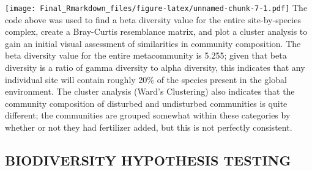 \documentclass[
]{article}
\begin{document}
\texttt{[image: Final\_Rmarkdown\_files/figure-latex/unnamed-chunk-7-1.pdf]}
The code above was used to find a beta diversity value for the entire
site-by-species complex, create a Bray-Curtis resemblance matrix, and
plot a cluster analysis to gain an initial visual assessment of
similarities in community composition. The beta diversity value for the
entire metacommunity is 5.255; given that beta diversity is a ratio of
gamma diversity to alpha diversity, this indicates that any individual
site will contain roughly 20\% of the species present in the global
environment. The cluster analysis (Ward's Clustering) also indicates
that the community composition of disturbed and undisturbed communities
is quite different; the communities are grouped somewhat within these
categories by whether or not they had fertilizer added, but this is not
perfectly consistent.

\hypertarget{biodiversity-hypothesis-testing}{%
\subsection{BIODIVERSITY HYPOTHESIS
TESTING}\label{biodiversity-hypothesis-testing}}
\end{document}
